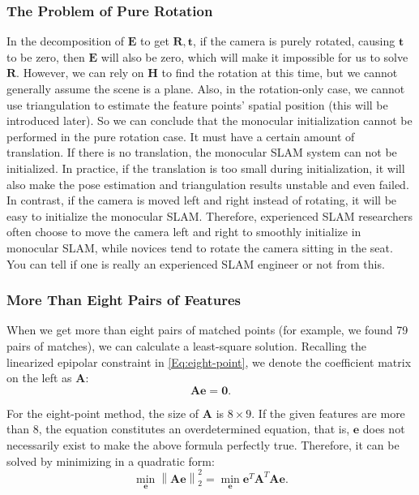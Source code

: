 \subsubsection{The Problem of Pure Rotation}
In the decomposition of $\mathbf{E}$ to get $\mathbf{R}, \mathbf{t}$, if the camera is purely rotated, causing $\mathbf{t}$ to be zero, then $\mathbf{E}$ will also be zero, which will make it impossible for us to solve $\mathbf{R}$. However, we can rely on $\mathbf{H}$ to find the rotation at this time, but we cannot generally assume the scene is a plane. Also, in the rotation-only case, we cannot use triangulation to estimate the feature points' spatial position (this will be introduced later). So we can conclude that the monocular initialization cannot be performed in the pure rotation case. It must have a certain amount of translation. If there is no translation, the monocular SLAM system can not be initialized. In practice, if the translation is too small during initialization, it will also make the pose estimation and triangulation results unstable and even failed. In contrast, if the camera is moved left and right instead of rotating, it will be easy to initialize the monocular SLAM. Therefore, experienced SLAM researchers often choose to move the camera left and right to smoothly initialize in monocular SLAM, while novices tend to rotate the camera sitting in the seat. You can tell if one is really an experienced SLAM engineer or not from this.

\subsubsection{More Than Eight Pairs of Features}
When we get more than eight pairs of matched points (for example, we found 79 pairs of matches), we can calculate a least-square solution. Recalling the linearized epipolar constraint in \eqref{Eq:eight-point}, we denote the coefficient matrix on the left as $\mathbf{A}$:
\begin{equation}
\mathbf{A} \mathbf{e} = \mathbf{0} .
\end{equation}

For the eight-point method, the size of $\mathbf{A}$ is $8 \times 9$. If the given features are more than $8$, the equation constitutes an overdetermined equation, that is, $\mathbf{e}$ does not necessarily exist to make the above formula perfectly true. Therefore, it can be solved by minimizing in a quadratic form:
\begin{equation}
\mathop {\min }\limits_{\mathbf{e}} \left\| \mathbf{Ae} \right\|_2^2 = \mathop {\min }\limits_{\mathbf{e}} { \mathbf{e}^T} {\mathbf{A}^T} \mathbf{Ae}.
\end{equation}

